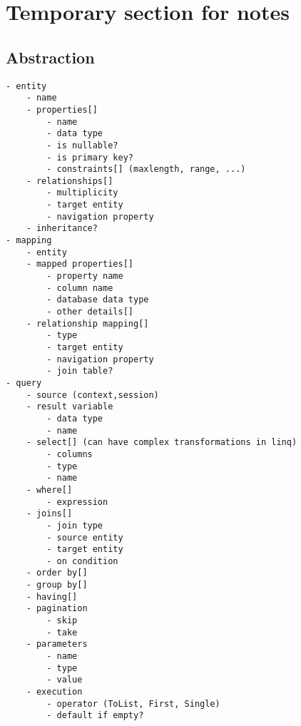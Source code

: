 \chapter{Temporary section for notes}

\section{Abstraction}
\begin{verbatim}
- entity
	- name
	- properties[]
		- name
		- data type
		- is nullable?
		- is primary key?
		- constraints[] (maxlength, range, ...)
	- relationships[]
		- multiplicity
		- target entity
		- navigation property
	- inheritance?
- mapping
	- entity
	- mapped properties[]
		- property name
		- column name
		- database data type
		- other details[]
	- relationship mapping[]
		- type
		- target entity
		- navigation property
		- join table?
- query
	- source (context,session)
	- result variable
		- data type
		- name
	- select[] (can have complex transformations in linq)
		- columns
		- type
		- name
	- where[]
		- expression
	- joins[]
		- join type
		- source entity
		- target entity
		- on condition
	- order by[]
	- group by[]
	- having[]
	- pagination
		- skip
		- take
	- parameters
		- name
		- type
		- value
	- execution
		- operator (ToList, First, Single)
		- default if empty?
\end{verbatim}

